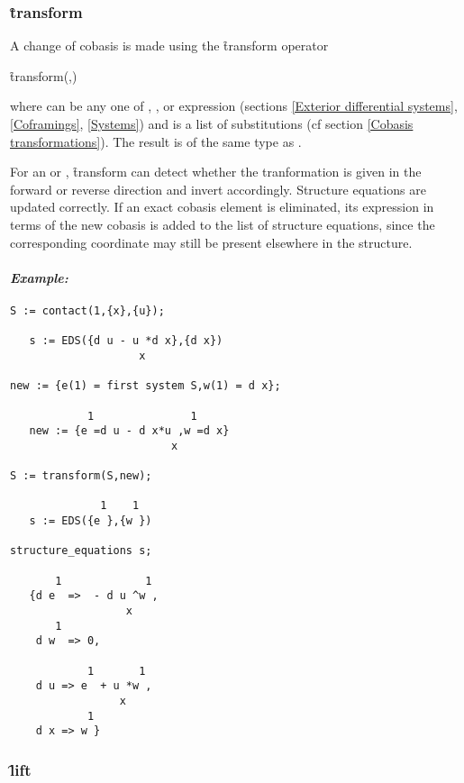 \subsubsection{\f{transform}}
\label{transform}

\hypertarget{operator:TRANSFORM}{}
A change of cobasis is made using the \f{transform} operator
\begin{syntax}
	\f{transform}(,)
\end{syntax}
where  can be any one of , ,
 or  expression (sections \ref{Exterior
differential systems}, \ref{Coframings}, \ref{Systems}) and 
is a list of substitutions (cf section \ref{Cobasis transformations}). The
result is of the same type as .

For an  or , \f{transform} can detect whether the
tranformation is given in the forward or reverse direction and invert
accordingly. Structure equations are updated correctly. If an exact cobasis
element is eliminated, its expression in terms of the new cobasis is added
to the list of structure equations, since the corresponding coordinate may
still be present elsewhere in the structure.

\paragraph{\textit{Example:}}
\begin{verbatim}
S := contact(1,{x},{u});

   s := EDS({d u - u *d x},{d x})
                    x

new := {e(1) = first system S,w(1) = d x};

            1               1
   new := {e =d u - d x*u ,w =d x}
                         x

S := transform(S,new);

              1    1
   s := EDS({e },{w })

structure_equations s;

       1             1
   {d e  =>  - d u ^w ,
                  x
       1
    d w  => 0,

            1       1
    d u => e  + u *w ,
                 x
            1
    d x => w }
\end{verbatim}

\subsubsection{\f{lift}}
\label{lift}

